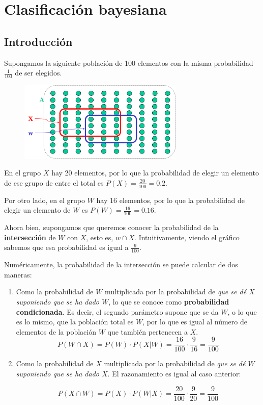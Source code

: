 \documentclass[11pt]{scrartcl}
\begin{document}
\pagebreak

\section{Clasificación bayesiana}

\subsection{Introducción}

Supongamos la siguiente población de 100 elementos con la misma probabilidad
$\frac{1}{100}$ de ser elegidos.

\begin{figure}[h!]
  \centering
  \includegraphics[width=0.7\textwidth]{img/bayes1}
\end{figure}

En el grupo $X$ hay 20 elementos, por lo que la probabilidad de elegir un
elemento de ese grupo de entre el total es $P(X) = \frac{20}{100} = 0.2$.

Por otro lado, en el grupo $W$ hay 16 elementos, por lo que la probabilidad de
elegir un elemento de $W$ es $P(W) = \frac{16}{100} = 0.16$.

Ahora bien, supongamos que queremos conocer la probabilidad de la
\textbf{intersección} de $W$ con $X$, esto es, $w \cap X$. Intuitivamente,
viendo el gráfico sabemos que esa probabilidad es igual a $\frac{9}{100}$.

Numéricamente, la probabilidad de la intersección se puede calcular de dos maneras:

\begin{enumerate}
\item Como la probabilidad de $W$ multiplicada por la probabilidad de
  \textit{que se dé $X$ suponiendo que se ha dado $W$}, lo que se conoce como
  \textbf{probabilidad condicionada}. Es decir, el segundo parámetro supone que
  se da $W$, o lo que es lo mismo, que la población total es $W$, por lo que es
  igual al número de elementos de la población $W$ que también pertenecen a $X$.
\[
P(W \cap X) = P(W) \cdot P(X|W) = \frac{16}{100} \cdot \frac{9}{16} = \frac{9}{100}
\]
\item Como la probabilidad de $X$ multiplicada por la probabilidad de
  \textit{que se dé $W$ suponiendo que se ha dado $X$}. El razonamiento es igual
  al caso anterior:

\[
P(X \cap W) = P(X) \cdot P(W|X) = \frac{20}{100} \cdot \frac{9}{20} = \frac{9}{100}
\]
\end{enumerate}
\end{document}
